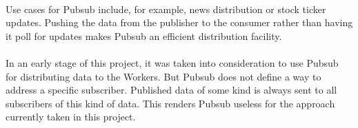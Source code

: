 \paragraph{}
Use cases for Pubsub include, for example, news distribution or stock ticker updates. Pushing the data from the publisher to the consumer rather than having it poll for updates makes Pubsub an efficient distribution facility.

\paragraph{}
In an early stage of this project, it was taken into consideration to use Pubsub for distributing data to the Workers. But Pubsub does not define a way to address a specific subscriber. Published data of some kind is always sent to all subscribers of this kind of data. This renders Pubsub useless for the approach currently taken in this project.
